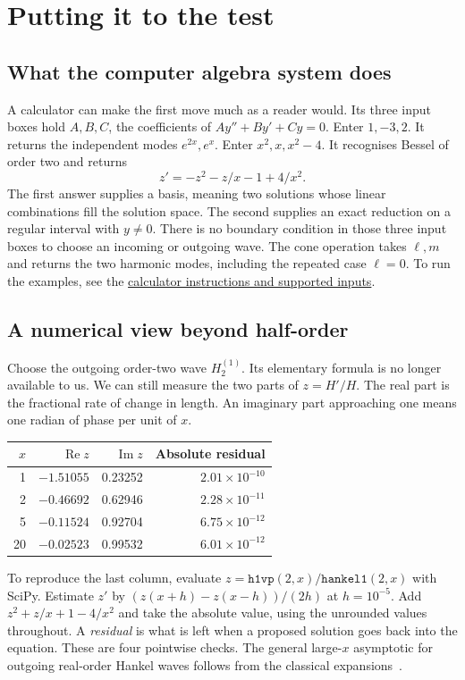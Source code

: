 \documentclass[11pt,a4paper]{amsart}
\newcommand{\caslink}{https://github.com/nickyazdani9-ux/better_calculator/blob/6e75789b946429b259de33fb6c93be74dfc2b8a8/docs/ODE.md}
\theoremstyle{definition}
\theoremstyle{remark}
\begin{document}
\section{Putting it to the test}\label{sec:numerical}
\subsection{What the computer algebra system does}
A calculator can make the first move much as a reader would. Its three input boxes hold \(A,B,C\), the coefficients of \(Ay''+By'+Cy=0\). Enter \(1,-3,2\). It returns the independent modes \(e^{2x},e^x\). Enter \(x^2,x,x^2-4\). It recognises Bessel of order two and returns
\[
 z'=-z^2-z/x-1+4/x^2 .
\]
The first answer supplies a basis, meaning two solutions whose linear combinations fill the solution space. The second supplies an exact reduction on a regular interval with \(y\ne0\). There is no boundary condition in those three input boxes to choose an incoming or outgoing wave. The cone operation takes \(\ell,m\) and returns the two harmonic modes, including the repeated case \(\ell=0\). To run the examples, see the \href{\caslink}{calculator instructions and supported inputs}.

\subsection{A numerical view beyond half-order}
Choose the outgoing order-two wave \(H^{(1)}_2\). Its elementary formula is no longer available to us. We can still measure the two parts of \(z=H'/H\). The real part is the fractional rate of change in length. An imaginary part approaching one means one radian of phase per unit of \(x\).
\begin{center}\small
\begin{tabular}{@{}r r r r@{}}
\toprule
\(x\)&\(\operatorname{Re}z\)&\(\operatorname{Im}z\)& Absolute residual\\
\midrule
1  & \(-1.51055\)&0.23252&\(2.01\times10^{-10}\)\\
2  & \(-0.46692\)&0.62946&\(2.28\times10^{-11}\)\\
5  & \(-0.11524\)&0.92704&\(6.75\times10^{-12}\)\\
20 & \(-0.02523\)&0.99532&\(6.01\times10^{-12}\)\\
\bottomrule
\end{tabular}
\end{center}
To reproduce the last column, evaluate \(z=\texttt{h1vp}(2,x)/\texttt{hankel1}(2,x)\) with SciPy. Estimate \(z'\) by \((z(x+h)-z(x-h))/(2h)\) at \(h=10^{-5}\). Add \(z^2+z/x+1-4/x^2\) and take the absolute value, using the unrounded values throughout. A \emph{residual} is what is left when a proposed solution goes back into the equation. These are four pointwise checks. The general large-\(x\) asymptotic for outgoing real-order Hankel waves follows from the classical expansions~\cite{NISTBessel}.
\end{document}
